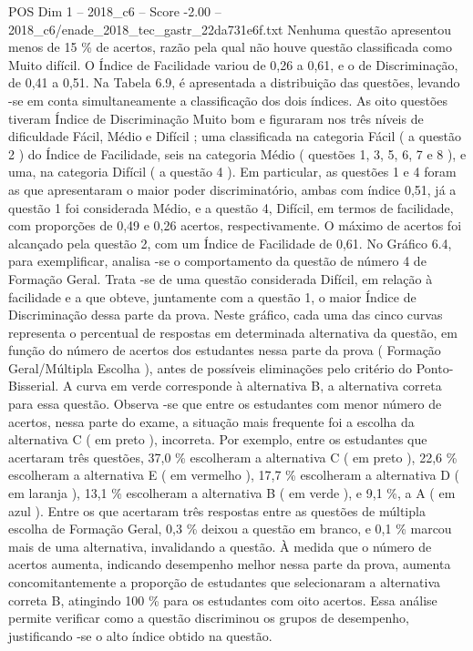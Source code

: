 \begin{textsample}{POS Dim 1 – 2018\_c6 – Score -2.00 – 2018\_c6/enade\_2018\_tec\_gastr\_22da731e6f.txt}
Nenhuma questão apresentou menos de 15 \% de acertos, razão pela qual não houve questão classificada como Muito difícil.
O Índice de Facilidade variou de 0,26 a 0,61, e o de Discriminação, de 0,41 a 0,51.
Na Tabela 6.9, é apresentada a distribuição das questões, levando -se em conta simultaneamente a classificação dos dois índices.
As oito questões tiveram Índice de Discriminação Muito bom e figuraram nos três níveis de dificuldade Fácil, Médio e Difícil ; uma classificada na categoria Fácil ( a questão 2 ) do Índice de Facilidade, seis na categoria Médio ( questões 1, 3, 5, 6, 7 e 8 ), e uma, na categoria Difícil ( a questão 4 ).
Em particular, as questões 1 e 4 foram as que apresentaram o maior poder discriminatório, ambas com índice 0,51, já a questão 1 foi considerada Médio, e a questão 4, Difícil, em termos de facilidade, com proporções de 0,49 e 0,26 acertos, respectivamente.
O máximo de acertos foi alcançado pela questão 2, com um Índice de Facilidade de 0,61.
No Gráfico 6.4, para exemplificar, analisa -se o comportamento da questão de número 4 de Formação Geral.
Trata -se de uma questão considerada Difícil, em relação à facilidade e a que obteve, juntamente com a questão 1, o maior Índice de Discriminação dessa parte da prova.
Neste gráfico, cada uma das cinco curvas representa o percentual de respostas em determinada alternativa da questão, em função do número de acertos dos estudantes nessa parte da prova ( Formação Geral/Múltipla Escolha ), antes de possíveis eliminações pelo critério do Ponto-Bisserial.
A curva em verde corresponde à alternativa B, a alternativa correta para essa questão.
Observa -se que entre os estudantes com menor número de acertos, nessa parte do exame, a situação mais frequente foi a escolha da alternativa C ( em preto ), incorreta.
Por exemplo, entre os estudantes que acertaram três questões, 37,0 \% escolheram a alternativa C ( em preto ), 22,6 \% escolheram a alternativa E ( em vermelho ), 17,7 \% escolheram a alternativa D ( em laranja ), 13,1 \% escolheram a alternativa B ( em verde ), e 9,1 \%, a A ( em azul ).
Entre os que acertaram três respostas entre as questões de múltipla escolha de Formação Geral, 0,3 \% deixou a questão em branco, e 0,1 \% marcou mais de uma alternativa, invalidando a questão.
À medida que o número de acertos aumenta, indicando desempenho melhor nessa parte da prova, aumenta concomitantemente a proporção de estudantes que selecionaram a alternativa correta B, atingindo 100 \% para os estudantes com oito acertos.
Essa análise permite verificar como a questão discriminou os grupos de desempenho, justificando -se o alto índice obtido na questão.

\end{textsample}
